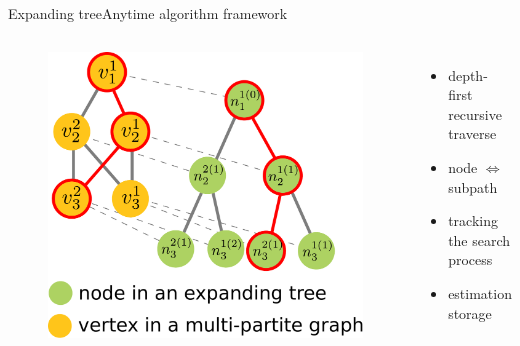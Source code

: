 \begin{frame}{Expanding tree}{Anytime algorithm framework}

\begin{columns}

\begin{minipage}{\textwidth}
\begin{figure}
\centering
\includegraphics[width=.9\textwidth]{./figure/multipartite_expandingtree}
\end{figure}
\end{minipage}

\begin{minipage}{\textwidth}
\begin{itemize}
\item depth-first recursive traverse
\item node $ \Longleftrightarrow $ subpath
\item tracking the search process
\item estimation storage
\end{itemize}
\end{minipage}

\end{columns}

\end{frame}

